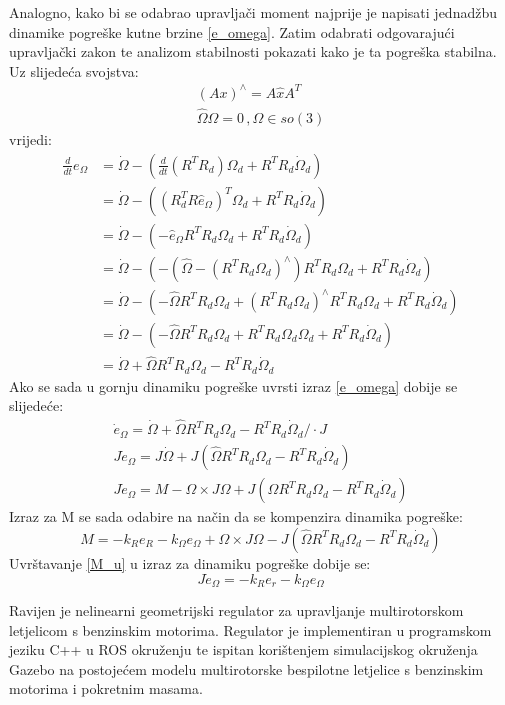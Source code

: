 \documentclass[times, utf8, diplomski]{fer}
\begin{document}
	\newpage
	\clearpage
	
	Analogno, kako bi se odabrao upravljači moment najprije je napisati jednadžbu dinamike pogreške kutne brzine \ref{e_omega}. Zatim odabrati odgovarajući upravljački zakon te analizom stabilnosti pokazati kako je ta pogreška stabilna.
	\\ Uz slijedeća svojstva:
	\begin{gather}
		(Ax)^\wedge = A\hat{x}A^T \\
		\hat{\Omega}\Omega = 0 \, , \Omega\in so(3)
	\end{gather}
	vrijedi:
	\begin{align*}
		\frac{d}{dt} e_\Omega &= \dot{\Omega} - \left(\frac{d}{dt}(R^TR_d)\Omega_d + R^TR_d\dot{\Omega}_d\right) \\
		&= \dot{\Omega} - ( (R_d^TR\hat{e}_\Omega)^T\Omega_d + R^TR_d\dot{\Omega}_d) \\
		&= \dot{\Omega} - (-\hat{e}_\Omega R^TR_d\Omega_d + R^TR_d\dot{\Omega}_d)\\
		&= \dot{\Omega} - (- (\hat{\Omega} - (R^TR_d\Omega_d)^\wedge)R^TR_d\Omega_d + R^TR_d\dot{\Omega}_d)\\
		&= \dot{\Omega} - (- \hat{\Omega}R^TR_d\Omega_d + (R^TR_d\Omega_d)^\wedge R^TR_d\Omega_d + R^TR_d\dot{\Omega}_d)\\
		&= \dot{\Omega} - (- \hat{\Omega}R^TR_d\Omega_d + R^TR_d\Omega_d\Omega_d + R^TR_d\dot{\Omega}_d) \\
		&= \dot{\Omega} + \hat{\Omega}R^TR_d\Omega_d - R^TR_d\dot{\Omega}_d
	\end{align*}
	Ako se sada u gornju dinamiku pogreške uvrsti izraz \ref{e_omega} dobije se slijedeće:
	\begin{gather*}
		\dot{e}_\Omega = \dot{\Omega} + \hat{\Omega}R^TR_d\Omega_d - R^TR_d\dot{\Omega}_d / \cdot J\\
		J\dot{e}_\Omega = J \dot{\Omega} + J(\hat{\Omega}R^TR_d\Omega_d - R^TR_d\dot{\Omega}_d) \\
		J\dot{e}_\Omega = M - \Omega \times J\Omega + J(\hat{\Omega}R^TR_d\Omega_d - R^TR_d\dot{\Omega}_d)
	\end{gather*}
	Izraz za M se sada odabire na način da se kompenzira dinamika pogreške:
	\begin{equation}
		M = -k_R e_R - k_\Omega e_\Omega + \Omega \times J \Omega - J(\hat{\Omega}R^TR_d\Omega_d - R^TR_d\dot{\Omega}_d) \label{M_u}
	\end{equation}
	Uvrštavanje \ref{M_u} u izraz za dinamiku pogreške dobije se:
	\begin{equation}
		J\dot{e}_\Omega = -k_R e_r - k_\Omega e_\Omega
	\end{equation}
\begin{sazetak}
Ravijen je nelinearni geometrijski regulator za upravljanje multirotorskom letjelicom s benzinskim motorima. Regulator je implementiran u programskom jeziku C++ u ROS okruženju te ispitan korištenjem simulacijskog okruženja Gazebo na postojećem modelu multirotorske bespilotne letjelice s benzinskim motorima i pokretnim masama.

\end{sazetak}
\end{document}
